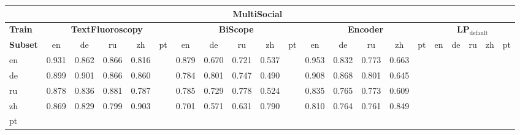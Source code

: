 \noindent
\begin{tabular}{lcccccccccccccccccccc}
\toprule
\multicolumn{21}{c}{\textbf{MultiSocial~\citep{macko2025multi}}} \\
\midrule
\textbf{Train}  & \multicolumn{5}{c}{\textbf{TextFluoroscopy}} & \multicolumn{5}{c}{\textbf{BiScope}} & \multicolumn{5}{c}{\textbf{Encoder}} & \multicolumn{5}{c}{\textbf{LP$_{\mathrm{default}}$}} \\
\cmidrule(lr){2-6}\cmidrule(lr){7-11}\cmidrule(lr){12-16}\cmidrule(lr){17-21}
\textbf{Subset} & en & de & ru & zh & pt & en & de & ru & zh & pt & en & de & ru & zh & pt & en & de & ru & zh & pt \\
\midrule
en & 0.931 & 0.862 & 0.866 & 0.816 &  & 0.879 & 0.670 & 0.721 & 0.537 &  & 0.953 & 0.832 & 0.773 & 0.663 &  &  &  &  &  &  \\
de & 0.899 & 0.901 & 0.866 & 0.860 &  & 0.784 & 0.801 & 0.747 & 0.490 &  & 0.908 & 0.868 & 0.801 & 0.645 &  &  &  &  &  &  \\
ru & 0.878 & 0.836 & 0.881 & 0.787 &  & 0.785 & 0.729 & 0.778 & 0.524 &  & 0.835 & 0.765 & 0.773 & 0.609 &  &  &  &  &  &  \\
zh & 0.869 & 0.829 & 0.799 & 0.903 &  & 0.701 & 0.571 & 0.631 & 0.790 &  & 0.810 & 0.764 & 0.761 & 0.849 &  &  &  &  &  &  \\
pt &  &  &  &  &  &  &  &  &  &  &  &  &  &  &  &  &  &  &  &  \\
\bottomrule
\end{tabular}

